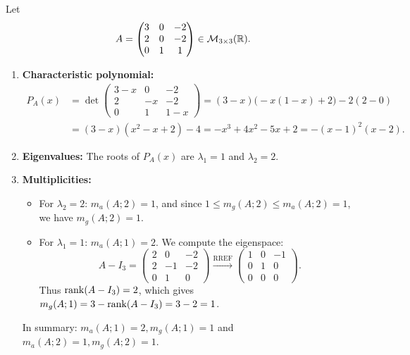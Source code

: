 \begin{exercisesolution*}
\label{sol:multiplicities_3x3_matrix}
Let
\[
A = \begin{pmatrix} 3 & 0 & -2 \\ 2 & 0 & -2 \\ 0 & 1 & 1 \end{pmatrix} \in \mathcal{M}_{3 \times 3}(\mathbb{R}).
\]
\begin{enumerate}[label=\textbf{(\alph*)}]
    \item \textbf{Characteristic polynomial:}
    \begin{align*}
    P_A(x) &= \det \begin{pmatrix} 3-x & 0 & -2 \\ 2 & -x & -2 \\ 0 & 1 & 1-x \end{pmatrix} = (3-x)\big(-x(1-x) + 2\big) - 2(2 - 0) \\
    &= (3-x)(x^2 - x + 2) - 4 = -x^3 + 4x^2 - 5x + 2 = -(x-1)^2(x-2).
    \end{align*}

    \item \textbf{Eigenvalues:}
    The roots of $P_A(x)$ are $\lambda_1 = 1$ and $\lambda_2 = 2$.

    \item \textbf{Multiplicities:}
    \begin{itemize}
        \item For $\lambda_2 = 2$: $m_a(A; 2) = 1$, and since $1 \le m_g(A; 2) \le m_a(A; 2) = 1$, we have $m_g(A; 2) = 1$.
        \item For $\lambda_1 = 1$: $m_a(A; 1) = 2$. We compute the eigenspace:
        \[
        A - I_3 = \begin{pmatrix} 2 & 0 & -2 \\ 2 & -1 & -2 \\ 0 & 1 & 0 \end{pmatrix} \xrightarrow{\text{RREF}} \begin{pmatrix} 1 & 0 & -1 \\ 0 & 1 & 0 \\ 0 & 0 & 0 \end{pmatrix}.
        \]
        Thus $\operatorname{rank}(A - I_3) = 2$, which gives $m_g(A; 1) = 3 - \operatorname{rank}(A - I_3) = 3 - 2 = 1$.
    \end{itemize}
    In summary: $m_a(A; 1) = 2, m_g(A; 1) = 1$ and $m_a(A; 2) = 1, m_g(A; 2) = 1$. \qedhere
\end{enumerate}
\end{exercisesolution*}

